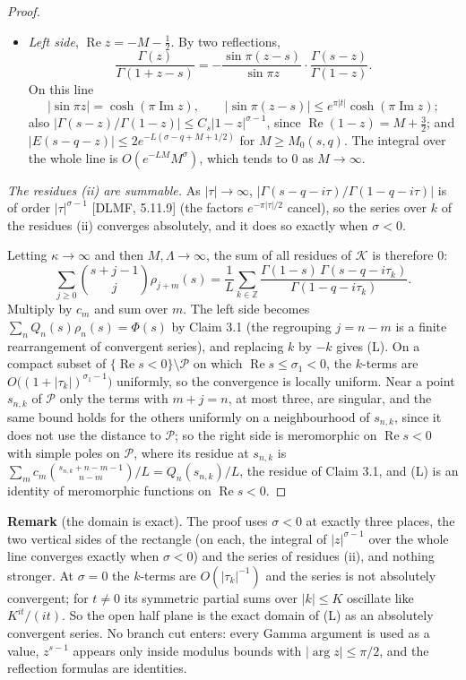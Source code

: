 \documentclass[11pt]{article}
\newcommand{\re}{\operatorname{Re}}
\newcommand{\im}{\operatorname{Im}}
\begin{document}
\begin{proof}
\begin{itemize}
\[
C\int_{-\infty}^{\infty}\bigl(\Lambda^2+y^2\bigr)^{(\sigma-1)/2}\,dy=C'\Lambda^{\sigma},
\]
which tends to $0$ as $\Lambda\to\infty$ because $\sigma<0$. This is where the half plane comes from.
\item \emph{Left side}, $\re z=-M-\frac12$. By two reflections,
\[
\frac{\Gamma(z)}{\Gamma(1+z-s)}=-\frac{\sin\pi(z-s)}{\sin\pi z}\cdot\frac{\Gamma(s-z)}{\Gamma(1-z)}.
\]
On this line
\[
|\sin\pi z|=\cosh(\pi\im z),\qquad|\sin\pi(z-s)|\le e^{\pi|t|}\cosh(\pi\im z);
\]
also $|\Gamma(s-z)/\Gamma(1-z)|\le C_s|1-z|^{\sigma-1}$, since $\re(1-z)=M+\frac32$; and $|E(s-q-z)|\le2e^{-L(\sigma-q+M+1/2)}$ for $M\ge M_0(s,q)$. The integral over the whole line is $O(e^{-LM}M^{\sigma})$, which tends to $0$ as $M\to\infty$.
\end{itemize}

\emph{The residues (ii) are summable.} As $|\tau|\to\infty$, $|\Gamma(s-q-i\tau)/\Gamma(1-q-i\tau)|$ is of order $|\tau|^{\sigma-1}$ [DLMF, 5.11.9] (the factors $e^{-\pi|\tau|/2}$ cancel), so the series over $k$ of the residues (ii) converges absolutely, and it does so exactly when $\sigma<0$.

Letting $\kappa\to\infty$ and then $M,\Lambda\to\infty$, the sum of all residues of $\mathcal{K}$ is therefore $0$:
\[
\sum_{j\ge0}\binom{s+j-1}{j}\rho_{j+m}(s)=\frac1L\sum_{k\in\mathbb{Z}}\frac{\Gamma(1-s)\,\Gamma(s-q-i\tau_k)}{\Gamma(1-q-i\tau_k)}.
\]
Multiply by $c_m$ and sum over $m$. The left side becomes $\sum_nQ_n(s)\rho_n(s)=\Phi(s)$ by Claim 3.1 (the regrouping $j=n-m$ is a finite rearrangement of convergent series), and replacing $k$ by $-k$ gives (L). On a compact subset of $\{\re s<0\}\setminus\mathcal{P}$ on which $\re s\le\sigma_1<0$, the $k$-terms are $O\bigl((1+|\tau_k|)^{\sigma_1-1}\bigr)$ uniformly, so the convergence is locally uniform. Near a point $s_{n,k}$ of $\mathcal{P}$ only the terms with $m+j=n$, at most three, are singular, and the same bound holds for the others uniformly on a neighbourhood of $s_{n,k}$, since it does not use the distance to $\mathcal{P}$; so the right side is meromorphic on $\re s<0$ with simple poles on $\mathcal{P}$, where its residue at $s_{n,k}$ is $\sum_mc_m\binom{s_{n,k}+n-m-1}{n-m}/L=Q_n(s_{n,k})/L$, the residue of Claim 3.1, and (L) is an identity of meromorphic functions on $\re s<0$.
\end{proof}

\noindent\textbf{Remark} (the domain is exact). The proof uses $\sigma<0$ at exactly three places, the two vertical sides of the rectangle (on each, the integral of $|z|^{\sigma-1}$ over the whole line converges exactly when $\sigma<0$) and the series of residues (ii), and nothing stronger. At $\sigma=0$ the $k$-terms are $O(|\tau_k|^{-1})$ and the series is not absolutely convergent; for $t\ne0$ its symmetric partial sums over $|k|\le K$ oscillate like $K^{it}/(it)$. So the open half plane is the exact domain of (L) as an absolutely convergent series. No branch cut enters: every Gamma argument is used as a value, $z^{s-1}$ appears only inside modulus bounds with $|\arg z|\le\pi/2$, and the reflection formulas are identities.
\end{document}
